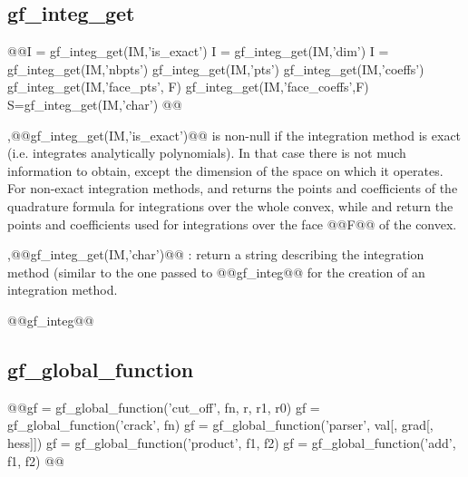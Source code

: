 \subsection{gf\_integ_get}
\begin{synopsis}
@@\tint I = gf_integ_get(IM,'is_exact')
\tint I = gf_integ_get(IM,'dim')
\tint I = gf_integ_get(IM,'nbpts')
\tmat gf_integ_get(IM,'pts')
\tvec gf_integ_get(IM,'coeffs')
\tmat gf_integ_get(IM,'face_pts', \tint F)
\tvec gf_integ_get(IM,'face_coeffs',\tint F)
\tstr S=gf_integ_get(IM,'char')
@@\end{synopsis}
\begin{cmddescription}
  \sep{@@gf_integ_get(IM,'is_exact')@@} is non-null if the integration
  method is exact (i.e. integrates analytically polynomials). In that
  case there is not much information to obtain, except the dimension
  of the space on which it operates. For non-exact integration
  methods,  and
   returns the points and
  coefficients of the quadrature formula for integrations over the
  whole convex, while  and
   return the points and
  coefficients used for integrations over the face @@F@@ of the
  convex.
  
  \sep{@@gf_integ_get(IM,'char')@@} : return a string describing the integration
  method (similar to the one passed to @@gf_integ@@ for the creation of an
  integration method.
\end{cmddescription}
\begin{gfseealso}
@@gf_integ@@
\end{gfseealso}
\newpage




\subsection{gf\_global_function}
\begin{synopsis}
@@\tgl gf = gf_global_function('cut_off', \tint fn, \tscal r, \tscal r1, \tscal r0)
  \tgl gf = gf_global_function('crack', \tint fn)
  \tgl gf = gf_global_function('parser', \tstr val[, \tstr grad[, \tstr hess]])
  \tgl gf = gf_global_function('product', \tgl f1, \tgl f2)
  \tgl gf = gf_global_function('add', \tgl f1, \tgl f2)
@@\end{synopsis}


